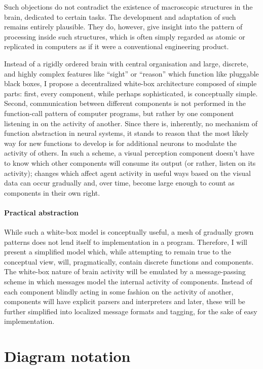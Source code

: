 \documentclass[]{scrartcl}
\theoremstyle{break}
\begin{document}
Such objections do not contradict the existence of macroscopic structures in the brain, dedicated to certain tasks. The development and adaptation of such remains entirely plausible. They do, however, give insight into the pattern of processing inside such structures, which is often simply regarded as atomic or replicated in computers as if it were a conventional engineering product.

Instead of a rigidly ordered brain with central organisation and large, discrete, and highly complex features like ``sight'' or ``reason'' which function like pluggable black boxes, I propose a decentralized white-box architecture composed of simple parts: first, every component, while perhaps sophisticated, is conceptually simple. Second, communication between different components is not performed in the function-call pattern of computer programs, but rather by one component listening in on the activity of another. Since there is, inherently, no mechanism of function abstraction in neural systems, it stands to reason that the most likely way for new functions to develop is for additional neurons to modulate the activity of others. In such a scheme, a visual perception component doesn't have to know which other components will consume its output (or rather, listen on its activity); changes which affect agent activity in useful ways based on the visual data can occur gradually and, over time, become large enough to count as components in their own right.

\paragraph{Practical abstraction}

While such a white-box model is conceptually useful, a mesh of gradually grown patterns does not lend itself to implementation in a program. Therefore, I will present a simplified model which, while attempting to remain true to the conceptual view, will, pragmatically, contain discrete functions and components. The white-box nature of brain activity will be emulated by a message-passing scheme in which messages model the internal activity of components. Instead of each component blindly acting in some fashion on the activity of another, components will have explicit parsers and interpreters and later, these will be further simplified into localized message formats and tagging, for the sake of easy implementation.

\section{Diagram notation}
\end{document}

